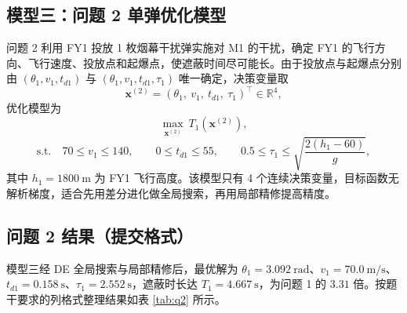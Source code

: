 \documentclass[11pt,a4paper]{ctexart}
\begin{document}
\subsection{模型三：问题 2 单弹优化模型}

问题 2 利用 FY1 投放 1 枚烟幕干扰弹实施对 M1 的干扰，确定 FY1 的飞行方向、飞行速度、投放点和起爆点，使遮蔽时间尽可能长。由于投放点与起爆点分别由 $(\theta_1,v_1,t_{d1})$ 与 $(\theta_1,v_1,t_{d1},\tau_1)$ 唯一确定，决策变量取
\begin{equation}
  \bm{x}^{(2)}=\left(\theta_1,\ v_1,\ t_{d1},\ \tau_1\right)^\top\in\mathbb{R}^4,
  \label{eq:x2}
\end{equation}
优化模型为
\begin{equation}
  \max_{\bm{x}^{(2)}}\ T_1(\bm{x}^{(2)}),
  \label{eq:obj2}
\end{equation}
\begin{equation}
  \text{s.t.}\quad
  70\le v_1\le 140,\qquad
  0\le t_{d1}\le 55,\qquad
  0.5\le \tau_1\le \sqrt{\frac{2(h_1-60)}{g}},
  \label{eq:con2}
\end{equation}
其中 $h_1=1800~\mathrm{m}$ 为 FY1 飞行高度。该模型只有 4 个连续决策变量，目标函数无解析梯度，适合先用差分进化做全局搜索，再用局部精修提高精度。

\subsection{问题 2 结果（提交格式）}

模型三经 DE 全局搜索与局部精修后，最优解为 $\theta_1=3.092~\mathrm{rad}$、$v_1=70.0~\mathrm{m/s}$、$t_{d1}=0.158~\mathrm{s}$、$\tau_1=2.552~\mathrm{s}$，遮蔽时长达 $T_1=4.667~\mathrm{s}$，为问题 1 的 $3.31$ 倍。按题干要求的列格式整理结果如表 \ref{tab:q2} 所示。

\begin{table}[H]
\centering
\caption{问题 2 最优结果（列格式与提交要求一致）}
\label{tab:q2}
\small
{}
\end{table}
\end{document}
